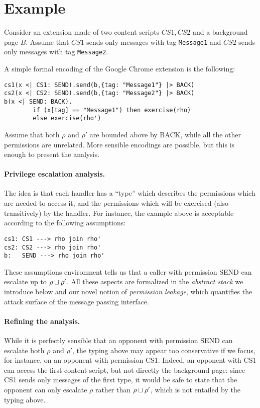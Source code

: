 \section{Example}
\label{sec:Example}
Consider an extension made of two content scripts $CS1,CS2$ and a background page $B$. Assume that $CS1$ sends only messages with tag \texttt{Message1} and $CS2$ sends only messages with tag \texttt{Message2}.

A simple formal encoding of the Google Chrome extension is the following:
\begin{verbatim}
cs1(x <| CS1: SEND).send(b,{tag: "Message1"} |> BACK)
cs2(x <| CS2: SEND).send(b,{tag: "Message2"} |> BACK)
b(x <| SEND: BACK).
        if (x[tag] == "Message1") then exercise(rho) 
        else exercise(rho')
\end{verbatim}
Assume that both $\rho$ and $\rho'$ are bounded above by BACK, while all the other permissions are unrelated. More sensible encodings are possible, but this is enough to present the analysis.

\paragraph{Privilege escalation analysis.}
The idea is that each handler has a ``type'' which describes the permissions which are needed to access it, and the permissions which will be exercised (also transitively) by the handler. For instance, the example above is acceptable according to the following assumptions:
\begin{verbatim}
cs1: CS1 ---> rho join rho'
cs2: CS2 ---> rho join rho'
b:   SEND ---> rho join rho'
\end{verbatim}
These assumptions environment tells us that a caller with permission SEND can escalate up to $\rho \sqcup \rho'$. All these aspects are formalized in the \emph{abstract stack} we introduce below and our novel notion of \emph{permission leakage}, which quantifies the attack surface of the message passing interface.

\paragraph{Refining the analysis.}
While it is perfectly sensible that an opponent with permission SEND can escalate both $\rho$ and $\rho'$, the typing above may appear too conservative if we focus, for instance, on an opponent with permission CS1. Indeed, an opponent with CS1 can access the first content script, but not directly the background page: since CS1 sends only messages of the first type, it would be safe to state that the opponent can only escalate $\rho$ rather than $\rho \sqcup \rho'$, which is not entailed by the typing above.

